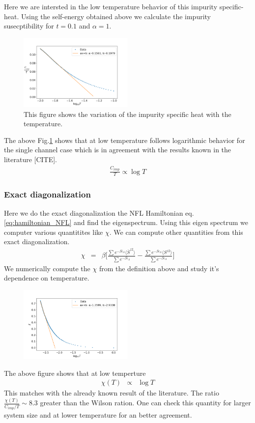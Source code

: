 \documentclass[reprint,prb,superscriptaddress]{revtex4-2}
\begin{document}
Here we are intersted in the low temperature behavior of this impurity specific-heat. Using the self-energy obtained above we calculate the impurity susecptibility for $t=0.1$ and $\alpha=1$. 
\begin{figure}
\centering
\includegraphics[width=0.5\textwidth]{plt/FINAL_fitted_Cv_t_0p1.png}
\caption{This figure shows the variation of the impurity specific heat with the temperature.}
\label{fig:Cv_imp}
\end{figure}
The above Fig.\ref{fig:Cv_imp} shows that at low temperature follows logarithmic behavior for the single channel case which is in agreement with the results known in the literature [CITE].
\begin{eqnarray}
\frac{C_{imp}}{T} \propto \log T
\end{eqnarray}


\subsubsection{Exact diagonalization}
Here we do the exact diagonalization the NFL Hamiltonian eq.\eqref{eq:hamiltonian_NFL} and find the eigenspectrum. Using this eigen spectrum  we computer various quantitites like $\chi$. We can compute other quantities from this exact diagonalization. 
\begin{eqnarray}
\chi &=& \beta\bigg[\frac{\sum e^{-\beta \bar{\epsilon}_{\Lambda}} \langle \bar{S}^{z2} \rangle}{\sum e^{-\beta \bar{\epsilon}_{\Lambda}} } -\frac{\sum e^{-\beta \epsilon_{\Lambda}} \langle S^{z2 }\rangle }{\sum e^{-\beta \epsilon_{\Lambda}} } \bigg] 
\end{eqnarray}
We numerically compute the $\chi$ from the definition above and study it's dependence on temperature.
\begin{figure}[!h]
\centering
\includegraphics[width=0.5\textwidth]{plt/NFL_Chi_log_0p1}
\end{figure}
The above figure shows that at low temperture
\begin{eqnarray}
\chi(T) &\propto& \log T
\end{eqnarray}
This matches with the already known result of the literature. The ratio $\frac{\chi(T)}{C_{imp}/T} \sim 8.3$ greater than the Wilson ration. One can check this quantity for larger system size and at lower temperature for an better agreement.
\end{document}

